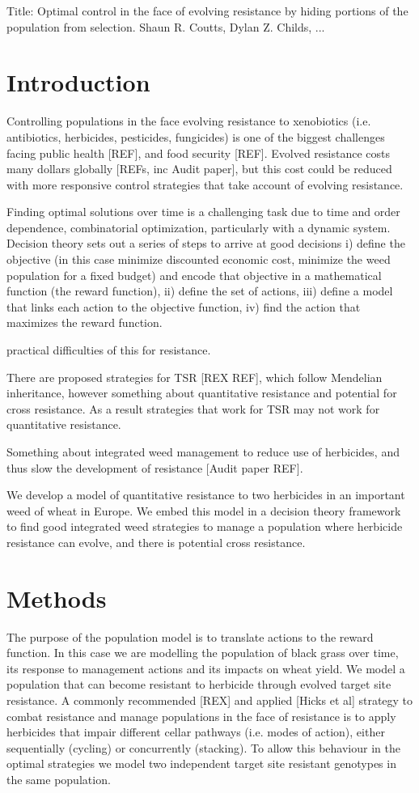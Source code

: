 \documentclass[12pt, a4paper]{article}
\begin{document}
Title: Optimal control in the face of evolving resistance by hiding portions of the population from selection.
Shaun R. Coutts, Dylan Z. Childs, ...

\section*{Introduction}
Controlling populations in the face evolving resistance to xenobiotics (i.e. antibiotics, herbicides, pesticides, fungicides) is one of the biggest challenges facing public health [REF], and food security [REF]. Evolved resistance costs many dollars globally [REFs, inc Audit paper], but this cost could be reduced with more responsive control strategies that take account of evolving resistance.

Finding optimal solutions over time is a challenging task due to time and order dependence, combinatorial optimization, particularly with a dynamic system. Decision theory sets out a series of steps to arrive at good decisions i) define the objective (in this case minimize discounted economic cost, minimize the weed population for a fixed budget) and encode that objective in a mathematical function (the reward function), ii) define the set of actions, iii) define a model that links each action to the objective function, iv) find the action that maximizes the reward function.

practical difficulties of this for resistance.           

There are proposed strategies for TSR [REX REF], which follow Mendelian inheritance, however something about quantitative resistance and potential for cross resistance. As a result strategies that work for TSR may not work for quantitative resistance.

Something about integrated weed management to reduce use of herbicides, and thus slow the development of resistance [Audit paper REF].      

We develop a model of quantitative resistance to two herbicides in an important weed of wheat in Europe. We embed this model in a decision theory framework to find good integrated weed strategies to manage a population where herbicide resistance can evolve, and there is potential cross resistance.        

\section*{Methods}
The purpose of the population model is to translate actions to the reward function. In this case we are modelling the population of black grass over time, its response to management actions and its impacts on wheat yield. We model a population that can become resistant to herbicide through evolved target site resistance. A commonly recommended [REX] and applied [Hicks et al] strategy to combat resistance and manage populations in the face of resistance is to apply herbicides that impair different cellar pathways (i.e. modes of action), either sequentially (cycling) or concurrently (stacking). To allow this behaviour in the optimal strategies we model two independent target site resistant genotypes in the same population.
\end{document}
